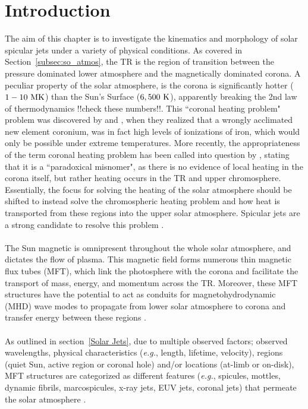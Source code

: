 \documentclass[12pt]{ociamthesis}
\newcommand{\np}{\\ \\}
\begin{document}
\section{Introduction}
\label{sec:c2intro}
The aim of this chapter is to investigate the kinematics and morphology of solar spicular jets under a variety of physical conditions. As covered in Section~\ref{subsec:so_atmos}, the TR is the region of transition between the pressure dominated lower atmosphere and the magnetically dominated corona. A peculiar property of the solar atmosphere, is the corona is significantly hotter ($1-10~\rm{MK}$) than the Sun's Surface ($6,500~\rm{K}$), apparently breaking the 2nd law of thermodynamics {\color{green}!!check these numbers!!}. This ``coronal heating problem" problem was discovered by \cite{Grotrian1939} and \cite{Edl1943}, when they realized that a wrongly acclimated new element coronium, was in fact high levels of ionizations of iron, which would only be possible under extreme temperatures. More recently, the appropriateness of the term coronal heating problem has been called into question by \cite{Aschwanden2007ApJ}, stating that it is a ``paradoxical misnomer", as there is no evidence of local heating in the corona itself, but rather heating occurs in the TR and upper chromosphere. Essentially, the focus for solving the heating of the solar atmosphere should be shifted to instead solve the chromospheric heating problem and how heat is transported from these regions into the upper solar atmosphere. Spicular jets are a strong candidate to resolve this problem \citep{Kudoh1999ApJ514493K, Pontieu2007PASJ, Martinez-Sykora2017,Moore2011ApJ731L18M, Pontieu2017ApJ, Samanta2019Sci, Zuo2019AcASn, Bale2019Natur}.\np
%
The Sun magnetic is omnipresent throughout the whole solar atmosphere, and dictates the flow of plasma. This magnetic field forms numerous thin magnetic flux tubes (MFT), which link the photosphere with the corona and facilitate the transport of mass, energy, and momentum across the TR. Moreover, these MFT structures have the potential to act as conduits for magnetohydrodynamic (MHD) wave modes to propagate from lower solar atmosphere to corona and transfer energy between these regions \citep{Pontieu2004Natur, Kukhianidze2006AA449L35K, Zaqarashvili2007AA474627Z, He2009AA497525H}. \np
%
%
As outlined in section~\ref{Solar Jets}, due to multiple observed factors; observed wavelengths, physical characteristics (\textit{e.g.}, length, lifetime, velocity), regions (quiet Sun, active region or coronal hole) and/or locations (at-limb or on-disk), MFT structures are categorized as different features (\textit{e.g.}, spicules, mottles, dynamic fibrils, marcospicules, x-ray jets, EUV jets, coronal jets) that permeate the solar atmosphere \citep[see reviews by:][]{Beckers1968, Beckers1972ARA&A, Tsiropoula2012}. \np
\end{document}
